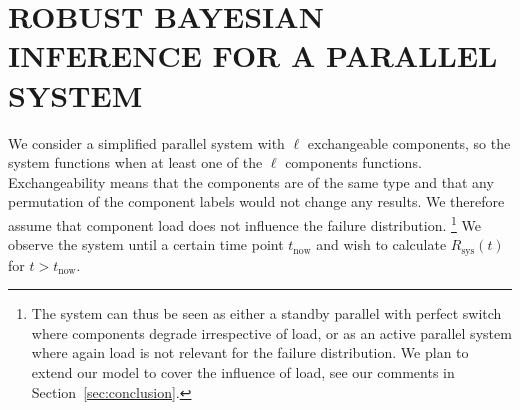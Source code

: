 \documentclass[12pt,a4paper,twocolumn,fleqn]{narms}
\begin{document}
\section{ROBUST BAYESIAN INFERENCE FOR A PARALLEL SYSTEM}
\label{sec:andrewsresults}

We consider a simplified parallel system with $\ell$ exchangeable components,
so the system functions when at least one of the $\ell$ components functions.
Exchangeability means that the components are of the same type
and that any permutation of the component labels would not change any results.
We therefore assume that component load does not influence the failure distribution.%
\footnote{The system can thus be seen as either a standby parallel with perfect switch
where components degrade irrespective of load,
or as an active parallel system where again load is not relevant for the failure distribution.
We plan to extend our model to cover the influence of load, see our comments in Section~\ref{sec:conclusion}.}
We observe the system until a certain time point $t_\text{now}$
and wish to calculate $R_\text{sys}(t)$ for $t > t_\text{now}$.
\end{document}

